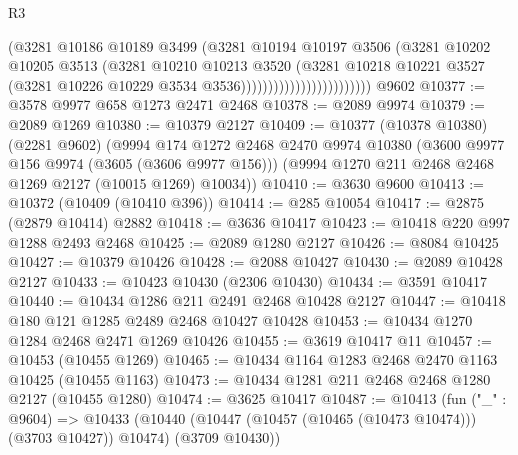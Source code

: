 \begin{lexlean}{R3}
\begin{coremodule}
                                        (@3281
                                          @10186
                                          @10189
                                          @3499
                                          (@3281
                                            @10194
                                            @10197
                                            @3506
                                            (@3281
                                              @10202
                                              @10205
                                              @3513
                                              (@3281
                                                @10210
                                                @10213
                                                @3520
                                                (@3281
                                                  @10218
                                                  @10221
                                                  @3527
                                                  (@3281
                                                    @10226
                                                    @10229
                                                    @3534
                                                    @3536))))))))))))))))))))))))
    @9602
@10377 := @3578 @9977 @658 @1273 @2471 @2468
@10378 := @2089 @9974
@10379 := @2089 @1269
@10380 := @10379 @2127
@10409 := @10377
    (@10378 @10380)
    (@2281 @9602)
    (@9994
      @174
      @1272
      @2468
      @2470
      @9974
      @10380
      (@3600 @9977 @156 @9974 (@3605 (@3606 @9977 @156)))
      (@9994 @1270 @211 @2468 @2468 @1269 @2127 (@10015 @1269) @10034))
@10410 := @3630 @9600
@10413 := @10372 (@10409 (@10410 @396))
@10414 := @285 @10054
@10417 := @2875 (@2879 @10414) @2882
@10418 := @3636 @10417
@10423 := @10418 @220 @997 @1288 @2493 @2468
@10425 := @2089 @1280 @2127
@10426 := @8084 @10425
@10427 := @10379 @10426
@10428 := @2088 @10427
@10430 := @2089 @10428 @2127
@10433 := @10423 @10430 (@2306 @10430)
@10434 := @3591 @10417
@10440 := @10434 @1286 @211 @2491 @2468 @10428 @2127
@10447 := @10418 @180 @121 @1285 @2489 @2468 @10427 @10428
@10453 := @10434 @1270 @1284 @2468 @2471 @1269 @10426
@10455 := @3619 @10417 @11
@10457 := @10453 (@10455 @1269)
@10465 := @10434 @1164 @1283 @2468 @2470 @1163 @10425 (@10455 @1163)
@10473 := @10434 @1281 @211 @2468 @2468 @1280 @2127 (@10455 @1280)
@10474 := @3625 @10417
@10487 := @10413
    (fun ("_" : @9604) =>
    @10433 (@10440 (@10447 (@10457 (@10465 (@10473 @10474))) (@3703 @10427)) @10474) (@3709 @10430))

\end{coremodule}
\end{lexlean}
